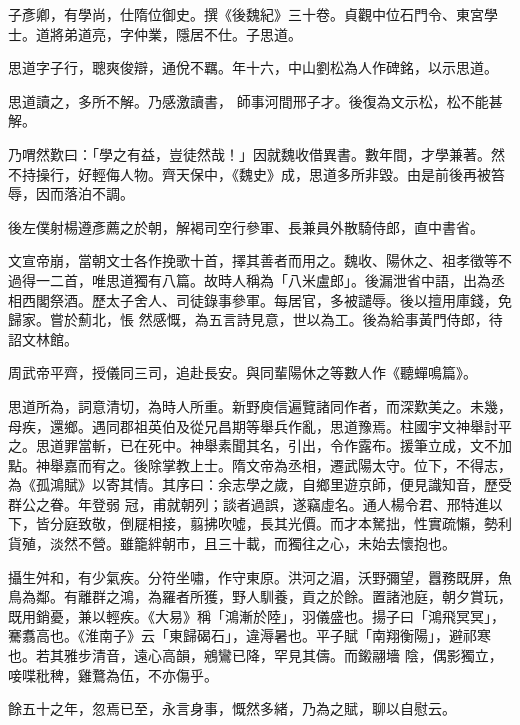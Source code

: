 \begin{pinyinscope}
 子彥卿，有學尚，仕隋位御史。撰《後魏紀》三十卷。貞觀中位石門令、東宮學士。道將弟道亮，字仲業，隱居不仕。子思道。



 思道字子行，聰爽俊辯，通侻不羈。年十六，中山劉松為人作碑銘，以示思道。



 思道讀之，多所不解。乃感激讀書，
 師事河間邢子才。後復為文示松，松不能甚解。



 乃喟然歎曰：「學之有益，豈徒然哉！」因就魏收借異書。數年間，才學兼著。然不持操行，好輕侮人物。齊天保中，《魏史》成，思道多所非毀。由是前後再被笞辱，因而落泊不調。



 後左僕射楊遵彥薦之於朝，解褐司空行參軍、長兼員外散騎侍郎，直中書省。



 文宣帝崩，當朝文士各作挽歌十首，擇其善者而用之。魏收、陽休之、祖孝徵等不過得一二首，唯思道獨有八篇。故時人稱為「八米盧郎」。後漏泄省中語，出為丞相西閣祭酒。歷太子舍人、司徒錄事參軍。每居官，多被譴辱。後以擅用庫錢，免歸家。嘗於薊北，悵
 然感慨，為五言詩見意，世以為工。後為給事黃門侍郎，待詔文林館。



 周武帝平齊，授儀同三司，追赴長安。與同輩陽休之等數人作《聽蟬鳴篇》。



 思道所為，詞意清切，為時人所重。新野庾信遍覽諸同作者，而深歎美之。未幾，母疾，還鄉。遇同郡祖英伯及從兄昌期等舉兵作亂，思道豫焉。柱國宇文神舉討平之。思道罪當斬，已在死中。神舉素聞其名，引出，令作露布。援筆立成，文不加點。神舉嘉而宥之。後除掌教上士。隋文帝為丞相，遷武陽太守。位下，不得志，為《孤鴻賦》以寄其情。其序曰：余志學之歲，自鄉里遊京師，便見識知音，歷受群公之眷。年登弱
 冠，甫就朝列；談者過誤，遂竊虛名。通人楊令君、邢特進以下，皆分庭致敬，倒屣相接，翦拂吹噓，長其光價。而才本駑拙，性實疏懶，勢利貨殖，淡然不營。雖籠絆朝市，且三十載，而獨往之心，未始去懷抱也。



 攝生舛和，有少氣疾。分符坐嘯，作守東原。洪河之湄，沃野彌望，囂務既屏，魚鳥為鄰。有離群之鴻，為羅者所獲，野人馴養，貢之於餘。置諸池庭，朝夕賞玩，既用銷憂，兼以輕疾。《大易》稱「鴻漸於陸」，羽儀盛也。揚子曰「鴻飛冥冥」，騫翥高也。《淮南子》云「東歸碣石」，違溽暑也。平子賦「南翔衡陽」，避祁寒也。若其雅步清音，遠心高韻，鵷鸞已降，罕見其儔。而鎩翮墻
 陰，偶影獨立，唼喋秕稗，雞鶩為伍，不亦傷乎。



 餘五十之年，忽焉已至，永言身事，慨然多緒，乃為之賦，聊以自慰云。




\end{pinyinscope}
